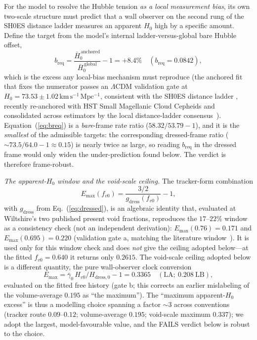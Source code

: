 \documentclass[aps,prd,twocolumn,nofootinbib,superscriptaddress,floatfix]{revtex4-2}
\newcommand{\Ho}{H_{0}}
\newcommand{\Hbaro}{\bar H_{0}}
\newcommand{\fvo}{f_{v0}}
\newcommand{\kmsmpc}{\,\mathrm{km\,s^{-1}\,Mpc^{-1}}}
\newcommand{\Lcdm}{\Lambda\mathrm{CDM}}
\newcommand{\breq}{b_{\mathrm{req}}}
\newcommand{\Emax}{E_{\max}}
\newcommand{\gdress}{g_{\mathrm{dress}}}
\begin{document}
For the model to resolve the Hubble tension \emph{as a local measurement bias},
its own two-scale structure must predict that a wall observer on the second rung
of the SH0ES distance ladder measures an apparent $\Ho$ high by a specific
amount. Define the target from the model's internal ladder-versus-global bare
Hubble offset,
\begin{equation}
\breq=\frac{\Hbaro^{\,\mathrm{anchored}}}{\Hbaro^{\,\mathrm{global}}}-1=+8.4\%
\quad(\breq=0.0842),
\label{eq:breq}
\end{equation}
which is the excess any local-bias mechanism must reproduce (the anchored fit
that fixes the numerator passes an $\Lcdm$ validation gate at
$\Ho=73.53\pm1.02\kmsmpc$, consistent with the SH0ES distance ladder
\cite{Riess2022}, recently re-anchored with HST Small Magellanic Cloud Cepheids
\cite{Breuval2024} and consolidated across estimators by the local distance-ladder
consensus~\cite{H0DN2025}). Equation~(\ref{eq:breq}) is a \emph{bare}-frame rate
ratio ($58.32/53.79-1$), and it is the \emph{smallest} of the admissible targets:
the corresponding dressed-frame ratio ($\sim\!73.5/64.0-1\approx0.15$) is nearly
twice as large, so reading $\breq$ in the dressed frame would only widen the
under-prediction found below. The verdict is therefore frame-robust.

\emph{The apparent-$\Ho$ window and the void-scale ceiling.} The tracker-form
combination
\begin{equation}
\Emax(\fvo)=\frac{3/2}{\gdress(\fvo)}-1,
\label{eq:emax}
\end{equation}
with $\gdress$ from Eq.~(\ref{eq:dressed}), is an algebraic identity that,
evaluated at Wiltshire's two published present void fractions, reproduces the
$17$--$22\%$ window as a consistency check (not an independent derivation):
$\Emax(0.76)=0.171$ and $\Emax(0.695)=0.220$ (validation gate a, matching the
literature window~\cite{Wiltshire2009,Wiltshire2009review,Wiltshire2013}). It is
used only for this window check and does \emph{not} give the ceiling adopted
below---at the fitted $\fvo=0.640$ it returns only $0.2615$. The void-scale
ceiling adopted below is a different quantity, the pure wall-observer clock
conversion
\begin{equation}
\Emax=\bar\gamma_0\,H_{v0}/H_{\mathrm{dress},0}-1=0.3365\quad(\text{LA};\ 0.208\ \text{LB}),
\end{equation}
evaluated on the fitted free history (gate b; this corrects an earlier
mislabeling of the volume-average $0.195$ as ``the maximum''). The ``maximum
apparent-$\Ho$ excess'' is thus a modelling choice spanning a factor $\sim\!3$
across conventions (tracker route $0.09$--$0.12$; volume-average $0.195$;
void-scale maximum $0.337$); we adopt the largest, model-favourable value, and the
FAILS verdict below is robust to the choice.
\end{document}
